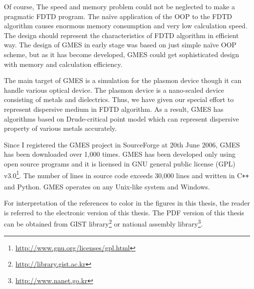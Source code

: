 Of course, The speed and memory problem could not be neglected to make a pragmatic FDTD program. The na\"ive application of the OOP to the FDTD algorithm causes enormous memory consumption and very low calculation speed. The design should represent the characteristics of FDTD algorithm in efficient way. The design of GMES in early stage was based on just simple na\"ive OOP scheme, but as it has become developed, GMES could get sophisticated design with memory and calculation efficiency.

The main target of GMES is a simulation for the plasmon device though it can handle various optical device. The plasmon device is a nano-scaled device consisting of metals and dielectrics. Thus, we have given our special effort to represent dispersive medium in FDTD algorithm. As a result, GMES has algorithms based on Drude-critical point model which can represent dispersive property of various metals accurately.

Since I registered the GMES project in SourceForge at 20th June 2006, GMES has been downloaded over 1,000 times. GMES has been developed only using open source programs and it is licensed in GNU general public license (GPL) v3.0\footnote{\url{http://www.gnu.org/licenses/gpl.html}}. The number of lines in source code exceeds 30,000 lines and written in C\verb!++! and Python. GMES operates on any Unix-like system and Windows\textsuperscript{\texttrademark}.

For interpretation of the references to color in the figures in this thesis, the reader is referred to the electronic version of this thesis. The PDF version of this thesis can be obtained from GIST library\footnote{\url{http://library.gist.ac.kr}} or national assembly library\footnote{\url{http://www.nanet.go.kr}}.
